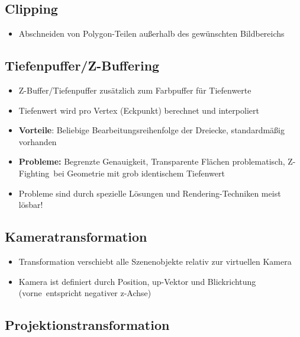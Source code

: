 \documentclass[10pt,a4paper]{article}
\begin{document}
	\subsection{Clipping}
	\label{rp:sub:clipping}
	
	\begin{itemize}
		\item Abschneiden von Polygon-Teilen außerhalb des gewünschten Bildbereichs
	\end{itemize}

	\subsection{Tiefenpuffer/Z-Buffering}
	\label{rp:sub:tiefenpuffer_z_buffering}
	
	\begin{itemize}
		\item Z-Buffer/Tiefenpuffer zusätzlich zum Farbpuffer für Tiefenwerte
		\item Tiefenwert wird pro Vertex (Eckpunkt) berechnet und interpoliert
		\item \textbf{Vorteile}: Beliebige Bearbeitungsreihenfolge der Dreiecke, standardmäßig vorhanden
		\item \textbf{Probleme:} Begrenzte Genauigkeit, Transparente Flächen problematisch, \glqq Z-Fighting\grqq\ bei Geometrie mit grob identischem Tiefenwert
		\item Probleme sind durch spezielle Lösungen und Rendering-Techniken meist lösbar!
	\end{itemize}

	\subsection{Kameratransformation}
	\label{rp:sub:kameratransformation}
	
	\begin{itemize}
		\item Transformation verschiebt alle Szenenobjekte relativ zur virtuellen Kamera
		\item Kamera ist definiert durch Position, up-Vektor und Blickrichtung (\glqq vorne\grqq\ entspricht negativer z-Achse)
	\end{itemize}

	\subsection{Projektionstransformation}
	\label{rp:sub:projektionstransformation}
	
\end{document}
